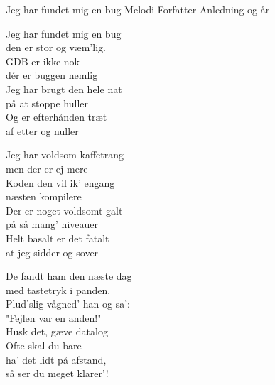 \begin{song}{Jeg har fundet mig en bug}
  {} %
  {Melodi} %
  {Forfatter} %
  {Anledning og år} %
  {\NotCCLIed} %

  \begin{SBVerse}
    Jeg har fundet mig en bug\\
    den er stor og væm’lig.\\
    GDB er ikke nok\\
    dér er buggen nemlig\\\medskip
    Jeg har brugt den hele nat\\
    på at stoppe huller\\
    Og er efterhånden træt\\
    af etter og nuller
  \end{SBVerse}

  \begin{SBVerse}
    Jeg har voldsom kaffetrang\\
    men der er ej mere\\
    Koden den vil ik’ engang\\
    næsten kompilere\\\medskip
    Der er noget voldsomt galt\\
    på så mang’ niveauer\\
    Helt basalt er det fatalt\\
    at jeg sidder og sover
  \end{SBVerse}

  \begin{SBVerse}
    De fandt ham den næste dag\\
    med tastetryk i panden.\\
    Plud’slig vågned’ han og sa’:\\
    "Fejlen var en anden!"\\\medskip
    Husk det, gæve datalog\\
    Ofte skal du bare\\
    ha’ det lidt på afstand,\\
    så ser du meget klarer’!
  \end{SBVerse}
\end{song}